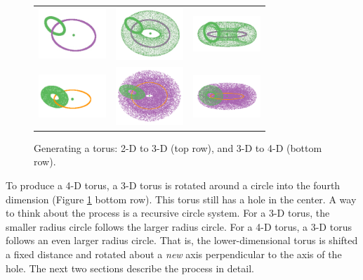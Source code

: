 \begin{figure}[ht]
\centering
\begin{tabular}{c c c}
\includegraphics[width=1in]{fig/torus-ring-3-2nd-1.pdf} & \includegraphics[width=1in]{fig/torus-ring-3-2nd-2.pdf} & \includegraphics[width=1in]{fig/torus-ring-3-2nd-3.pdf}   \\ \includegraphics[width=1in]{fig/torus-rings-4-2.pdf} &\includegraphics[width=1in]{fig/torus-rings-4-with-torus-2.pdf}&\includegraphics[width=1in]{fig/torus-rings-4-with-torus-1.pdf}
\end{tabular}
\caption{Generating a torus: 2-D to 3-D (top row), and 3-D to 4-D (bottom row).}
\label{ringtorus}
\end{figure}

To produce a 4-D torus, a 3-D torus is rotated around a circle into
the fourth dimension (Figure \ref{ringtorus} bottom row).  This torus
still has a hole in the center.  A way to think about the process is a
recursive circle system. For a 3-D torus, the smaller radius circle
follows the larger radius circle. For a 4-D torus, a 3-D torus follows an even
larger radius circle.  That is, the lower-dimensional torus is
shifted a fixed distance and rotated about a \textit{new} axis
perpendicular to the axis of the hole. The next two sections describe
the process in detail.


